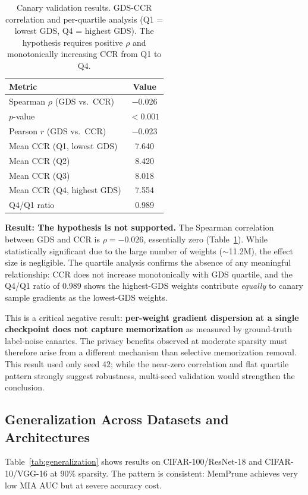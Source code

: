 \documentclass{article}
\begin{document}
\begin{table}[t]
\caption{Canary validation results. GDS-CCR correlation and per-quartile analysis (Q1 = lowest GDS, Q4 = highest GDS). The hypothesis requires positive $\rho$ and monotonically increasing CCR from Q1 to Q4.}
\label{tab:canary}
\centering
\begin{tabular}{lc}
\toprule
Metric & Value \\
\midrule
Spearman $\rho$ (GDS vs.\ CCR) & $-0.026$ \\
$p$-value & $< 0.001$ \\
Pearson $r$ (GDS vs.\ CCR) & $-0.023$ \\
\midrule
Mean CCR (Q1, lowest GDS) & 7.640 \\
Mean CCR (Q2) & 8.420 \\
Mean CCR (Q3) & 8.018 \\
Mean CCR (Q4, highest GDS) & 7.554 \\
Q4/Q1 ratio & 0.989 \\
\bottomrule
\end{tabular}
\end{table}

\textbf{Result: The hypothesis is not supported.} The Spearman correlation between GDS and CCR is $\rho = -0.026$, essentially zero (Table~\ref{tab:canary}). While statistically significant due to the large number of weights ($\sim$11.2M), the effect size is negligible. The quartile analysis confirms the absence of any meaningful relationship: CCR does not increase monotonically with GDS quartile, and the Q4/Q1 ratio of 0.989 shows the highest-GDS weights contribute \emph{equally} to canary sample gradients as the lowest-GDS weights.

This is a critical negative result: \textbf{per-weight gradient dispersion at a single checkpoint does not capture memorization} as measured by ground-truth label-noise canaries. The privacy benefits observed at moderate sparsity must therefore arise from a different mechanism than selective memorization removal. This result used only seed 42; while the near-zero correlation and flat quartile pattern strongly suggest robustness, multi-seed validation would strengthen the conclusion.

\subsection{Generalization Across Datasets and Architectures}

Table~\ref{tab:generalization} shows results on CIFAR-100/ResNet-18 and CIFAR-10/VGG-16 at 90\% sparsity. The pattern is consistent: MemPrune achieves very low MIA AUC but at severe accuracy cost.
\end{document}
